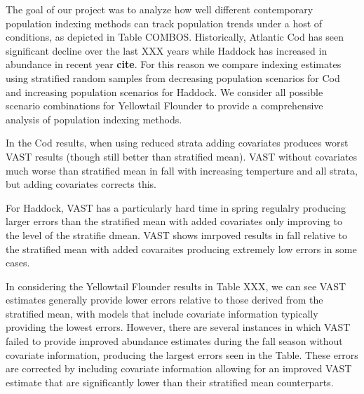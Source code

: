 \documentclass[
]{article}
\begin{document}
The goal of our project was to analyze how well different contemporary population indexing methods can track population trends under a host of conditions, as depicted in Table COMBOS. Historically, Atlantic Cod has seen significant decline over the last XXX years while Haddock has increased in abundance in recent year \textbf{cite}. For this reason we compare indexing estimates using stratified random samples from decreasing population scenarios for Cod and increasing population scenarios for Haddock. We consider all possible scenario combinations for Yellowtail Flounder to provide a comprehensive analysis of population indexing methods.

In the Cod results, when using reduced strata adding covariates produces worst VAST results (though still better than stratified mean). VAST without covariates much worse than stratified mean in fall with increasing temperture and all strata, but adding covariates corrects this.

For Haddock, VAST has a particularly hard time in spring regulalry producing larger errors than the stratified mean with added covariates only improving to the level of the stratifie dmean. VAST shows imrpoved results in fall relative to the stratified mean with added covaraites producing extremely low errors in some cases.

In considering the Yellowtail Flounder results in Table XXX, we can see VAST estimates generally provide lower errors relative to those derived from the stratified mean, with models that include covariate information typically providing the lowest errors. However, there are several instances in which VAST failed to provide improved abundance estimates during the fall season without covariate information, producing the largest errors seen in the Table. These errors are corrected by including covariate information allowing for an improved VAST estimate that are significantly lower than their stratified mean counterparts.
\end{document}
